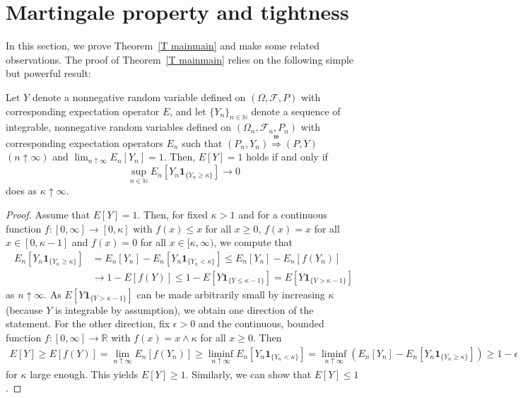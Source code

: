 \section{Martingale property and tightness}

\label{S main} In this section, we prove Theorem~\ref{T mainmain} and make
some related observations. The proof of Theorem~\ref{T mainmain} relies on
the following simple but powerful result:

\begin{proposition}
\label{T main} Let $Y$ denote a nonnegative random variable defined on $%
\left( \Omega,\mathcal{F}, P\right) $ with corresponding expectation
operator $E$, and let $\{Y_{n}\}_{n \in\mathbb{N}}$ denote a sequence of
integrable, nonnegative random variables defined on $\left( \Omega _{n},%
\mathcal{F}_{n}, P_{n}\right) $ with corresponding expectation operators $%
E_{n}$ such that $(P_{n},Y_{n} )\overset{\mathfrak{w}}{\Longrightarrow}(P,Y
) $ $(n \uparrow \infty)$ and $\lim_{n \uparrow\infty} E_{n}[Y_{n}] = 1$.
Then, $E[Y] = 1$ holds if and only if
\begin{equation*}
\sup_{n \in\mathbb{N}} E_{n}\left[ Y_{n} \mathbf{1}_{\{Y_{n} \geq\kappa \}}%
\right] \rightarrow0
\end{equation*}
does as $\kappa\uparrow\infty$.
\end{proposition}

\begin{proof}
Assume that $E[Y] = 1$. Then, for fixed $\kappa>1$ and for a continuous
function $f: [0,\infty] \rightarrow[0,\kappa]$ with $f(x) \leq x$ for all $x
\geq 0$, $f(x) = x$ for all $x \in[0, \kappa-1]$ and $f(x) = 0 $ for all $x
\in[\kappa, \infty)$, we compute that
\begin{align*}
E_n[Y_n \mathbf{1}_{\{Y_n \geq \kappa\}}] &= E_n[Y_n] - E_{n}[Y_n \mathbf{1}%
_{\{Y_{n} <\kappa\}} ] \leq E_n[Y_n] -E_{n}[f(Y_n) ] \\
& \rightarrow1 - E[f( Y) ] \leq1 - E[Y \mathbf{1}_{\{Y \leq\kappa- 1\}}] =
E[Y \mathbf{1}_{\{Y > \kappa- 1\}} ]
\end{align*}
as $n \uparrow\infty$. As $E[Y \mathbf{1}_{\{Y > \kappa- 1\}} ]$ can be made
arbitrarily small by increasing $\kappa$ (because $Y$ is integrable by
assumption), we obtain one direction of the statement. For the other
direction, fix $\epsilon>0$ and the continuous, bounded function $f:
[0,\infty] \rightarrow {\mathbb{R}}$ with $f(x) =x \wedge \kappa$ for all $x
\geq 0$. Then
\begin{align*}
E[Y] \geq E[f(Y)] = \lim_{n \uparrow \infty} E_n[f(Y_n)] \geq \liminf_{n
\uparrow \infty} E_n[Y_n \mathbf{1}_{\{Y_n < \kappa\}}] = \liminf_{n
\uparrow \infty} \left(E_n[Y_n] - E_n[Y_n \mathbf{1}_{\{Y_n \geq \kappa\}}]
\right) \geq 1-\epsilon
\end{align*}
for $\kappa$ large enough. This yields $E[Y] \geq 1$. Similarly, we can show
that $E[Y] \leq 1$.
\end{proof}

